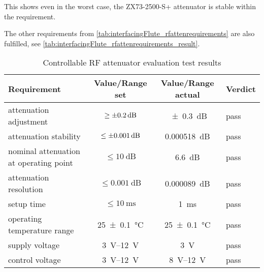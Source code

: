 This shows even in the worst case, the ZX73-2500-S+ attenuator is stable within the requirement.

The other requirements from \autoref{tab:interfacingFlute_rfattenrequirements} are also fulfilled, see \autoref{tab:interfacingFlute_rfattenrequirements_result}.

\begin{table}[tbh]
\caption{Controllable RF attenuator evaluation test results}
\label{tab:interfacingFlute_rfattenrequirements_result}
\centering
\begin{tabular}{lccl}
	\toprule
	Requirement                            &      {Value/Range} set      &  {Value/Range} actual   & Verdict \\ \midrule
	attenuation adjustment                 &    $\ge\SI{\pm0.2}{\dB}$    &    \SI{\pm0.3}{\dB}     & pass    \\
	attenuation stability                  &   $\le\SI{\pm0.001}{\dB}$   &   \SI{0.000518}{\dB}    & pass    \\
	nominal attenuation at operating point &      $\le\SI{10}{\dB}$      &      \SI{6.6}{\dB}      & pass    \\
	attenuation resolution                 &    $\le\SI{0.001}{\dB}$     &   \SI{0.000089}{\dB}    & pass    \\
	setup time                             & $\le\SI{10}{\milli\second}$ &       \SI{1}{\ms}       & pass    \\
	operating temperature range            &   \SI{25\pm0.1}{\celsius}   & \SI{25\pm0.1}{\celsius} & pass    \\
	supply voltage                         &   \SIrange{3}{12}{\volt}    &      \SI{3}{\volt}      & pass    \\
	control voltage                        &   \SIrange{3}{12}{\volt}    & \SIrange{8}{12}{\volt}  & pass    \\ \bottomrule
\end{tabular}
\end{table}



